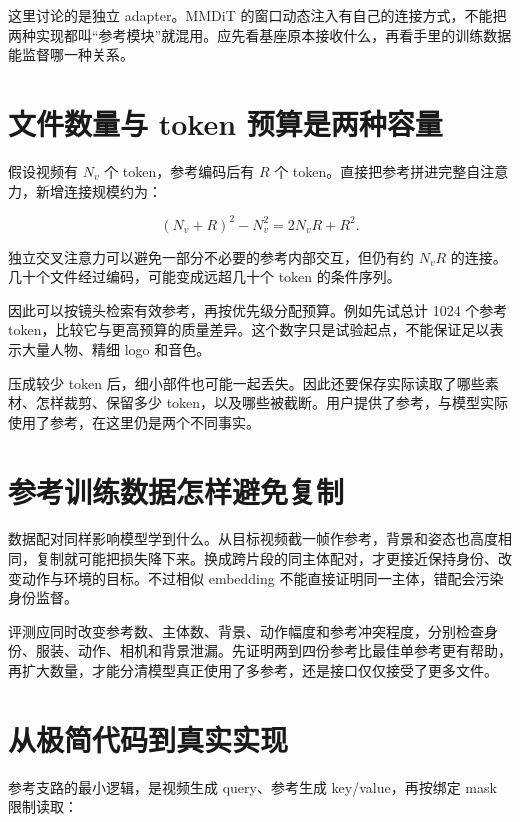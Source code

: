 这里讨论的是独立 adapter。MMDiT 的窗口动态注入有自己的连接方式，不能把两种实现都叫“参考模块”就混用。应先看基座原本接收什么，再看手里的训练数据能监督哪一种关系。

\section{文件数量与 token 预算是两种容量}\label{seedance-m07-ux6587ux4ef6ux6570ux91cfux4e0e-token-ux9884ux7b97ux662fux4e24ux79cdux5bb9ux91cf}

假设视频有 \(N_v\) 个 token，参考编码后有 \(R\) 个 token。直接把参考拼进完整自注意力，新增连接规模约为：

\[
(N_v+R)^2-N_v^2=2N_vR+R^2.
\]

独立交叉注意力可以避免一部分不必要的参考内部交互，但仍有约 \(N_vR\) 的连接。几十个文件经过编码，可能变成远超几十个 token 的条件序列。

因此可以按镜头检索有效参考，再按优先级分配预算。例如先试总计 1024 个参考 token，比较它与更高预算的质量差异。这个数字只是试验起点，不能保证足以表示大量人物、精细 logo 和音色。

压成较少 token 后，细小部件也可能一起丢失。因此还要保存实际读取了哪些素材、怎样裁剪、保留多少 token，以及哪些被截断。用户提供了参考，与模型实际使用了参考，在这里仍是两个不同事实。

\section{参考训练数据怎样避免复制}\label{seedance-m07-ux53c2ux8003ux8badux7ec3ux6570ux636eux600eux6837ux907fux514dux590dux5236}

数据配对同样影响模型学到什么。从目标视频截一帧作参考，背景和姿态也高度相同，复制就可能把损失降下来。换成跨片段的同主体配对，才更接近保持身份、改变动作与环境的目标。不过相似 embedding 不能直接证明同一主体，错配会污染身份监督。

评测应同时改变参考数、主体数、背景、动作幅度和参考冲突程度，分别检查身份、服装、动作、相机和背景泄漏。先证明两到四份参考比最佳单参考更有帮助，再扩大数量，才能分清模型真正使用了多参考，还是接口仅仅接受了更多文件。

\section{从极简代码到真实实现}\label{seedance-m07-ux4eceux6781ux7b80ux4ee3ux7801ux5230ux771fux5b9eux5b9eux73b0}

参考支路的最小逻辑，是视频生成 query、参考生成 key/value，再按绑定 mask 限制读取：

